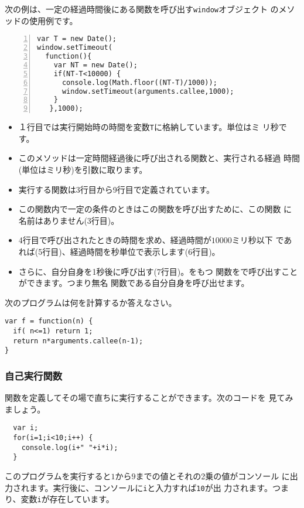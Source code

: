  次の例は、一定の経過時間後にある関数を呼び出す\verb+window+オブジェクト
 のメソッドの使用例です。
\begin{Verbatim}[numbers=left,firstnumber=1, numbersep=6pt]
var T = new Date();
window.setTimeout(
  function(){
    var NT = new Date();
    if(NT-T<10000) {
      console.log(Math.floor((NT-T)/1000));
      window.setTimeout(arguments.callee,1000);
    }
   },1000);
\end{Verbatim}
\begin{itemize}
 \item １行目では実行開始時の時間を変数\verb+T+に格納しています。単位はミ
       リ秒です。
 \item このメソッドは一定時間経過後に呼び出される関数と、実行される経過
       時間(単位はミリ秒)を引数に取ります。
 \item 実行する関数は3行目から9行目で定義されています。
 \item この関数内で一定の条件のときはこの関数を呼び出すために、この関数
       に名前はありません(3行目)。
 \item 4行目で呼び出されたときの時間を求め、経過時間が$10000$ミリ秒以下
       であれば(5行目)、経過時間を秒単位で表示します(6行目)。
 \item さらに、自分自身を1秒後に呼び出す(7行目)。をもつ
       関数をで呼び出すことができます。つまり無名
       関数である自分自身を呼び出せます。
\end{itemize}
%
\begin{Problem}\upshape
次のプログラムは何を計算するか答えなさい。
\begin{Verbatim}
var f = function(n) {
  if( n<=1) return 1;
  return n*arguments.callee(n-1);
}
\end{Verbatim}
\end{Problem}
\subsubsection{自己実行関数}
関数を定義してその場で直ちに実行することができます。次のコードを
見てみましょう。
\begin{Verbatim}
  var i;
  for(i=1;i<10;i++) {
    console.log(i+" "+i*i);
  }
\end{Verbatim}
このプログラムを実行すると$1$から$9$までの値とそれの2乗の値がコンソール
に出力されます。実行後に、コンソールに\verb+i+と入力すれば\verb+10+が出
力されます。つまり、変数\verb+i+が存在しています。

